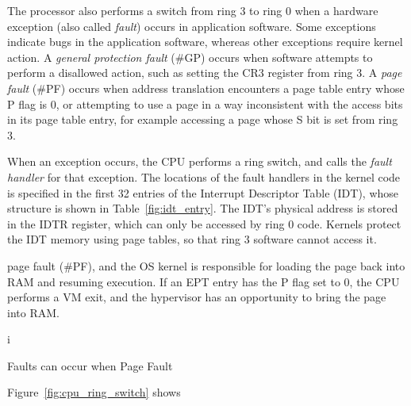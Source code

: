 
The processor also performs a switch from ring 3 to ring 0 when a hardware
exception (also called \textit{fault}) occurs in application software.  Some
exceptions indicate bugs in the application software, whereas other exceptions
require kernel action. A \textit{general protection fault} (\#GP) occurs when
software attempts to perform a disallowed action, such as setting the CR3
register from ring 3. A \textit{page fault} (\#PF) occurs when address
translation encounters a page table entry whose P flag is 0, or attempting to
use a page in a way inconsistent with the access bits in its page table entry,
for example accessing a page whose S bit is set from ring 3.

When an exception occurs, the CPU performs a ring switch, and calls the
\textit{fault handler} for that exception. The locations of the fault handlers
in the kernel code is specified in the first 32 entries of the Interrupt
Descriptor Table (IDT), whose structure is shown in Table~\ref{fig:idt_entry}.
The IDT's physical address is stored in the IDTR register, which can only be
accessed by ring 0 code. Kernels protect the IDT memory using page tables, so
that ring 3 software cannot access it.

\begin{table}[hbt]
  \caption{
    The fields of an IDT entry in 64-bit mode. Each entry points to a fault or
    interrupt handler.
  }
  \label{fig:idt_entry}
\end{table}




page fault (\#PF), and the OS kernel is responsible for loading the page back
into RAM and resuming execution. If an EPT entry has the P flag set to 0, the
CPU performs a VM exit, and the hypervisor has an opportunity to bring the page
into RAM.

i

Faults can occur when
Page Fault

Figure~\ref{fig:cpu_ring_switch} shows




